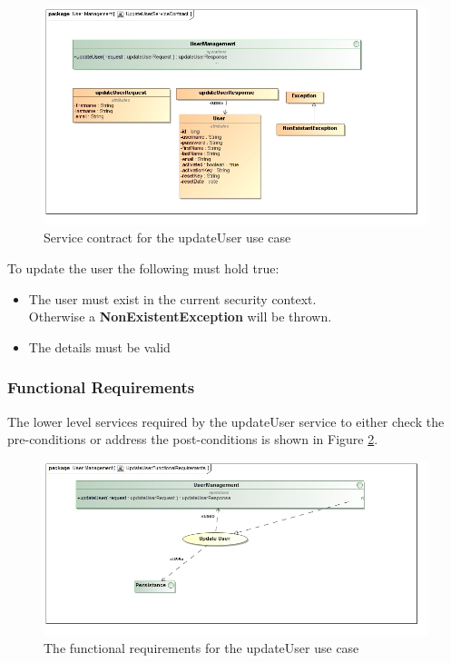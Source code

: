 \begin{figure}[H]
	\begin{center}
		\includegraphics[scale=0.55]{../Diagrams and Charts/Users/UpdateUserServiceContract.jpg}
		\caption{Service contract for the updateUser use case}
		\label{fig:updateUserServicesContract}
	\end{center}
\end{figure}

To update the user the following must hold true:
\begin{itemize}
	\item The user must exist in the current security context.\\
	Otherwise a \textbf{NonExistentException} will be thrown.
	\item The details must be valid
\end{itemize}

\subsubsection{Functional Requirements}
The lower level services required by the updateUser service
to either check the pre-conditions or address the post-conditions is shown
in Figure \ref{fig:updateUserFR}.

\begin{figure}[H]
	\begin{center}
		\includegraphics[scale=0.5]{../Diagrams and Charts/Users/UpdateUserFunctionalRequirements.jpg}
		\caption{The functional requirements for the updateUser use case}
		\label{fig:updateUserFR}
	\end{center}	
\end{figure}

